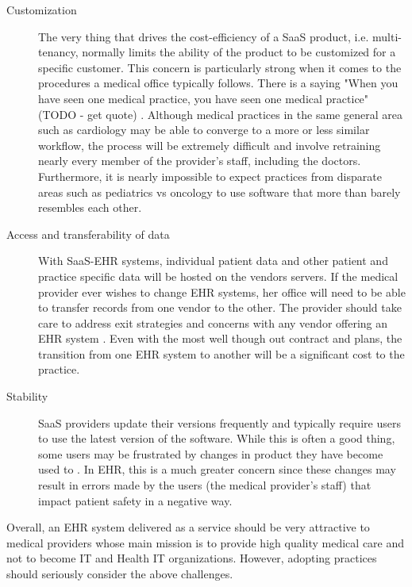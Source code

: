 \documentclass[10pt]{article}
\begin{document}
\begin{description}
\item[Customization]
The very thing that drives the cost-efficiency of a SaaS product, i.e. multi-tenancy, normally limits the ability of the product to be customized for a specific customer.
This concern is particularly strong when it comes to the procedures a medical office typically follows.
There is a saying "When you have seen one medical practice, you have seen one medical practice" (TODO - get quote) \cite{health-hack}.
Although medical practices in the same general area such as cardiology may be able to converge to a more or less similar workflow,
the process will be extremely difficult and involve retraining nearly every member of the provider's staff, including the doctors. 
Furthermore, it is nearly impossible to expect practices from disparate areas such as pediatrics vs oncology to use software that more than barely resembles each other.

\item[Access and transferability of data]
With SaaS-EHR systems, individual patient data and other patient and practice specific data will be hosted on the vendors servers.
If the medical provider ever wishes to change EHR systems, her office will need to be able to transfer records from one vendor to the other.
The provider should take care to address exit strategies and concerns with any vendor offering an EHR system \cite{ehr-breakup}.
Even with the most well though out contract and plans, the transition from one EHR system to another will be a significant cost to the practice.

\item[Stability]
SaaS providers update their versions frequently and typically require users to use the latest version of the software.
While this is often a good thing, some users may be frustrated by changes in product they have become used to \cite{wiki-saas}.
In EHR, this is a much greater concern since these changes may result in errors made by the users (the medical provider's staff) that impact patient safety in a negative way.

\end{description}

Overall, an EHR system delivered as a service should be very attractive to medical providers whose main mission is to provide high quality medical care and not to become IT and Health IT organizations.
However, adopting practices should seriously consider the above challenges.
\end{document}

